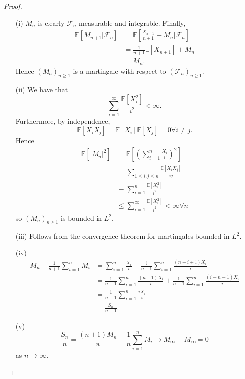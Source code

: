 \documentclass{article}
\begin{document}
\begin{proof}
\begin{enumerate}
\item[(i)] $M_n$ is clearly $\mathcal{F}_n$-measurable and integrable. Finally,\begin{align*}
\mathbb{E}[M_{n+1}|\mathcal{F}_n]&=\mathbb{E}\left[\frac{X_{n+1}}{n+1}+M_n|\mathcal{F}_n\right]\\&=\frac{1}{n+1}\mathbb{E}[X_{n+1}]+M_n\\&=M_n.
\end{align*}Hence $(M_n)_{n\geq 1}$ is a martingale with respect to $(\mathcal{F}_n)_{n\geq 1}$.
\item[(ii)]
We have that\[\sum_{i=1}^\infty\frac{\mathbb{E}[X_i^2]}{i^2}<\infty.\] Furthermore, by independence, \[\mathbb{E}[X_iX_j]=\mathbb{E}[X_i]\mathbb{E}[X_j]=0\forall i\neq j.\] Hence
\begin{align*}
\mathbb{E}[|M_n|^2]&=\mathbb{E}\left[\left(\sum_{i=1}^n\frac{X_i}{i}\right)^2\right]\\&=\sum_{1\leq i,j\leq n}\frac{\mathbb{E}[X_iX_j]}{ij}\\&=\sum_{i=1}^n\frac{\mathbb{E}[X_i^2]}{i^2}\\&\leq\sum_{i=1}^\infty\frac{\mathbb{E}[X_i^2]}{i^2}<\infty\forall n
\end{align*}so $(M_n)_{n\geq1}$ is bounded in $L^2$.
\item[(iii)] Follows from the convergence theorem for martingales bounded in $L^2$.
\item[(iv)]\begin{align*}
M_n-\frac{1}{n+1}\sum_{i=1}^nM_i&=\sum_{i=1}^n\frac{X_i}{i}-\frac{1}{n+1}\sum_{i=1}^n\frac{(n-i+1)X_i}{i}\\&=\frac{1}{n+1}\sum_{i=1}^n\frac{(n+1)X_i}{i}+\frac{1}{n+1}\sum_{i=1}^n\frac{(i-n-1)X_i}{i}\\&=\frac{1}{n+1}\sum_{i=1}^n\frac{iX_i}{i}\\&=\frac{S_n}{n+1}.
\end{align*}
\item[(v)] \[\frac{S_n}{n}=\frac{(n+1)M_n}{n}-\frac{1}{n}\sum_{i=1}^nM_i\to M_\infty-M_\infty=0\] as $n\to\infty$.
\end{enumerate}
\end{proof}
\end{document}

